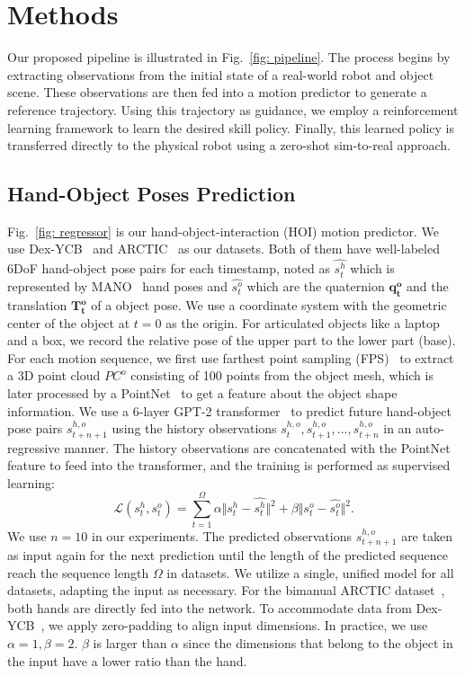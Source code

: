 \documentclass[letterpaper]{article}
\begin{document}
\section{Methods}
Our proposed pipeline is illustrated in Fig.~\ref{fig: pipeline}. The process begins by extracting observations from the initial state of a real-world robot and object scene. These observations are then fed into a motion predictor to generate a reference trajectory. Using this trajectory as guidance, we employ a reinforcement learning framework to learn the desired skill policy. Finally, this learned policy is transferred directly to the physical robot using a zero-shot sim-to-real approach.
\subsection{Hand-Object Poses Prediction}
Fig.~\ref{fig: regressor} is our hand-object-interaction (HOI) motion predictor. We use Dex-YCB~\cite{chao2021dexycb} and ARCTIC~\cite{fan2023arctic} as our datasets. Both of them have well-labeled 6DoF hand-object pose pairs for each timestamp, noted as $\hat{s_{t}^h}$ which is represented by MANO~\cite{romero2022embodied} hand poses and $\hat{s_{t}^o}$ which are the quaternion $\mathbf{q_{t}^o}$ and the translation $\mathbf{T_{t}^o}$ of a object pose. We use a coordinate system with the geometric center of the object at $t=0$ as the origin. For articulated objects like a laptop and a box, we record the relative pose of the upper part to the lower part (base). For each motion sequence, we first use farthest point sampling (FPS)~\cite{qi2017pointnet++} to extract a 3D point cloud $PC^o$ consisting of 100 points from the object mesh, which is later processed by a PointNet~\cite{qi2017pointnet} to get a feature about the object shape information. We use a 6-layer GPT-2 transformer~\cite{radford2019language} to predict future hand-object pose pairs $s_{t+n+1}^{h, o}$ using the history observations $s_{t}^{h, o}, s_{t+1}^{h, o}, ..., s_{t+n}^{h, o}$ in an auto-regressive manner. The history observations are concatenated with the PointNet feature to feed into the transformer, and the training is performed as supervised learning:
\begin{equation*}
\mathcal{L}(s_{t}^h, s_{t}^o) = \sum_{t=1}^{\Omega} \alpha\Vert s_{t}^h - \hat{s_{t}^h} \Vert^2 + \beta \Vert s_{t}^o - \hat{s_{t}^o} \Vert^2.
\end{equation*} We use $n=10$ in our experiments. The predicted observations $s_{t+n+1}^{h, o}$ are taken as input again for the next prediction until the length of the predicted sequence reach the sequence length $\Omega$ in datasets. We utilize a single, unified model for all datasets, adapting the input as necessary. For the bimanual ARCTIC dataset~\cite{fan2023arctic}, both hands are directly fed into the network. To accommodate data from Dex-YCB~\cite{chao2021dexycb}, we apply zero-padding to align input dimensions. In practice, we use $\alpha=1, \beta = 2$. $\beta$ is larger than $\alpha$ since the dimensions that belong to the object in the input have a lower ratio than the hand.
\end{document}
